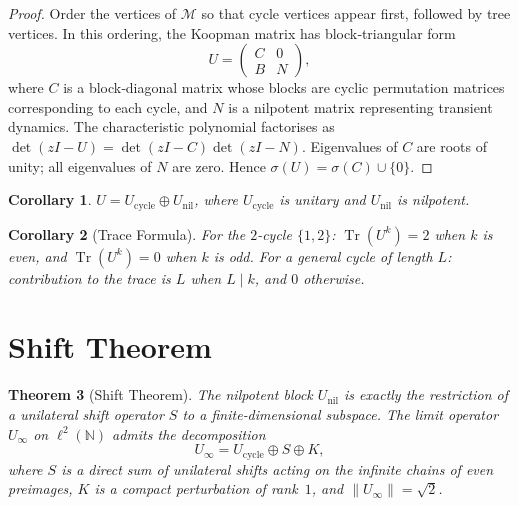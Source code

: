 \documentclass[12pt,a4paper]{article}
\newtheorem{theorem}{Theorem}[section]
\newtheorem{corollary}[theorem]{Corollary}
\theoremstyle{definition}
\theoremstyle{remark}
\DeclareMathOperator{\Tr}{Tr}
\begin{document}
\begin{proof}
Order the vertices of $\mathcal M$ so that cycle vertices appear first,
followed by tree vertices.
In this ordering, the Koopman matrix has block‑triangular form
\[
U=\begin{pmatrix} C & 0 \\ B & N \end{pmatrix},
\]
where $C$ is a block‑diagonal matrix whose blocks are cyclic
permutation matrices corresponding to each cycle, and $N$ is a
nilpotent matrix representing transient dynamics.
The characteristic polynomial factorises as
$\det(zI-U)=\det(zI-C)\det(zI-N)$.
Eigenvalues of $C$ are roots of unity; all eigenvalues of $N$ are
zero.
Hence $\sigma(U)=\sigma(C)\cup\{0\}$.
\end{proof}

\begin{corollary}\label{cor:decomp}
$U=U_{\text{cycle}}\oplus U_{\text{nil}}$, where $U_{\text{cycle}}$ is
unitary and $U_{\text{nil}}$ is nilpotent.
\end{corollary}

\begin{corollary}[Trace Formula]\label{cor:trace}
For the $2$-cycle $\{1,2\}$:
$\Tr(U^k)=2$ when $k$ is even, and $\Tr(U^k)=0$ when $k$ is odd.
For a general cycle of length $L$: contribution to the trace is $L$
when $L\mid k$, and $0$ otherwise.
\end{corollary}

\section{Shift Theorem}

\begin{theorem}[Shift Theorem]\label{thm:shift}
The nilpotent block $U_{\text{nil}}$ is exactly the restriction of a
unilateral shift operator $S$ to a finite‑dimensional subspace.
The limit operator $U_\infty$ on $\ell^2(\mathbb N)$ admits the
decomposition
\[
U_\infty = U_{\text{cycle}} \oplus S \oplus K,
\]
where $S$ is a direct sum of unilateral shifts acting on the infinite
chains of even preimages, $K$ is a compact perturbation of rank~$1$,
and $\|U_\infty\|=\sqrt2$.
\end{theorem}
\end{document}

